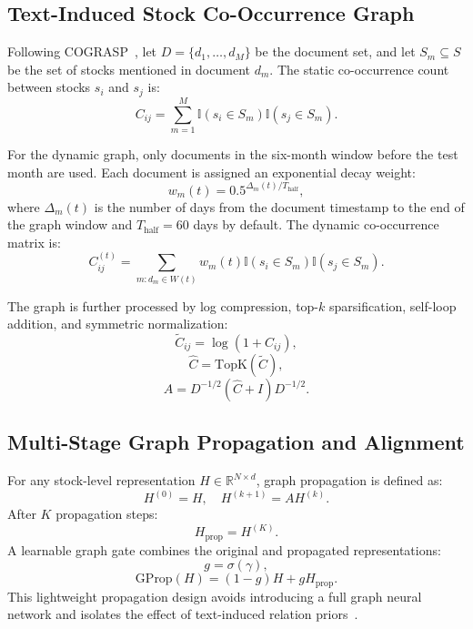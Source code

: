 \documentclass[runningheads]{llncs}
\begin{document}
\subsection{Text-Induced Stock Co-Occurrence Graph}

Following COGRASP~\cite{li2025cograsp}, let $D = \{d_1, \dots, d_M\}$ be the document set, and let $S_m \subseteq S$ be the set of stocks mentioned in document $d_m$. The static co-occurrence count between stocks $s_i$ and $s_j$ is:
\begin{equation}
C_{ij} = \sum_{m=1}^{M} \mathbb{I}(s_i \in S_m)\mathbb{I}(s_j \in S_m).
\end{equation}

For the dynamic graph, only documents in the six-month window before the test month are used. Each document is assigned an exponential decay weight:
\begin{equation}
w_m(t) = 0.5^{\Delta_m(t)/T_{\text{half}}},
\end{equation}
where $\Delta_m(t)$ is the number of days from the document timestamp to the end of the graph window and $T_{\text{half}} = 60$ days by default. The dynamic co-occurrence matrix is:
\begin{equation}
C^{(t)}_{ij} = \sum_{m : d_m \in W(t)} w_m(t)\mathbb{I}(s_i \in S_m)\mathbb{I}(s_j \in S_m).
\end{equation}

The graph is further processed by log compression, top-$k$ sparsification, self-loop addition, and symmetric normalization:
\begin{equation}
\tilde{C}_{ij} = \log(1 + C_{ij}),
\end{equation}
\begin{equation}
\hat{C} = \text{TopK}(\tilde{C}),
\end{equation}
\begin{equation}
A = D^{-1/2}(\hat{C}+I)D^{-1/2}.
\end{equation}

\subsection{Multi-Stage Graph Propagation and Alignment}

For any stock-level representation $H \in \mathbb{R}^{N \times d}$, graph propagation is defined as:
\begin{equation}
H^{(0)} = H, \quad H^{(k+1)} = A H^{(k)}.
\end{equation}
After $K$ propagation steps:
\begin{equation}
H_{\text{prop}} = H^{(K)}.
\end{equation}
A learnable graph gate combines the original and propagated representations:
\begin{equation}
g = \sigma(\gamma),
\end{equation}
\begin{equation}
\text{GProp}(H) = (1-g)H + gH_{\text{prop}}.
\end{equation}
This lightweight propagation design avoids introducing a full graph neural network and isolates the effect of text-induced relation priors~\cite{kipf2017semi,velivckovic2018graph}.
\end{document}
